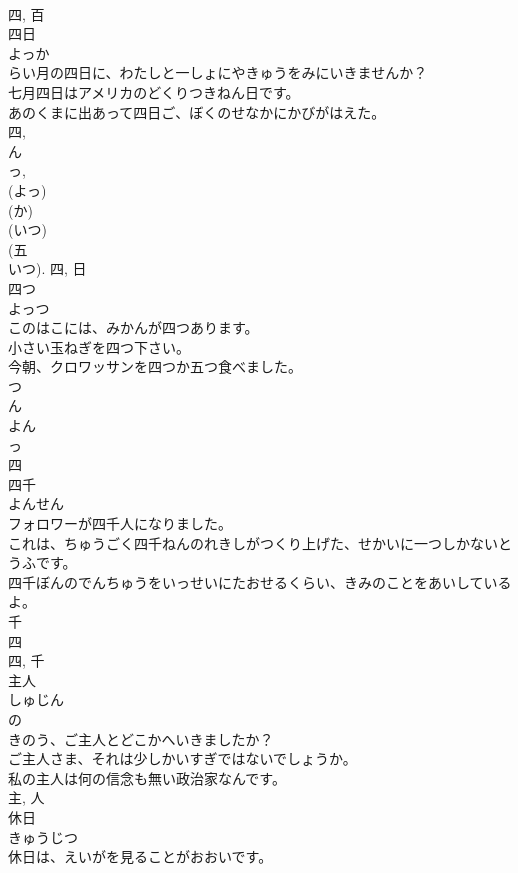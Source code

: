 \documentclass[8pt]{extreport}
\begin{document}
\begin{CJK}{UTF8}{min}
\\	四, 百	
\\	四日	
\\	よっか	
\\	らい月の四日に、わたしと一しょにやきゅうをみにいきませんか？	
\\	七月四日はアメリカのどくりつきねん日です。	
\\	あのくまに出あって四日ご、ぼくのせなかにかびがはえた。	
\\	四, 
\\	ん 
\\	っ, 
\\	(よっ) 
\\	(か) 
\\	(いつ) 
\\	(五
\\	いつ).	四, 日	
\\	四つ	
\\	よっつ	
\\	このはこには、みかんが四つあります。	
\\	小さい玉ねぎを四つ下さい。	
\\	今朝、クロワッサンを四つか五つ食べました。	
\\	つ 
\\	ん 
\\	よん 
\\	っ 
\\	四	
\\	四千	
\\	よんせん	
\\	フォロワーが四千人になりました。	
\\	これは、ちゅうごく四千ねんのれきしがつくり上げた、せかいに一つしかないとうふです。	
\\	四千ぼんのでんちゅうをいっせいにたおせるくらい、きみのことをあいしているよ。	
\\	千 
\\	四 
\\	四, 千	
\\	主人	
\\	しゅじん	
\\	の 
\\	きのう、ご主人とどこかへいきましたか？	
\\	ご主人さま、それは少しかいすぎではないでしょうか。	
\\	私の主人は何の信念も無い政治家なんです。	
\\	主, 人	
\\	休日	
\\	きゅうじつ	
\\	休日は、えいがを見ることがおおいです。	

\end{CJK}
\end{document}
